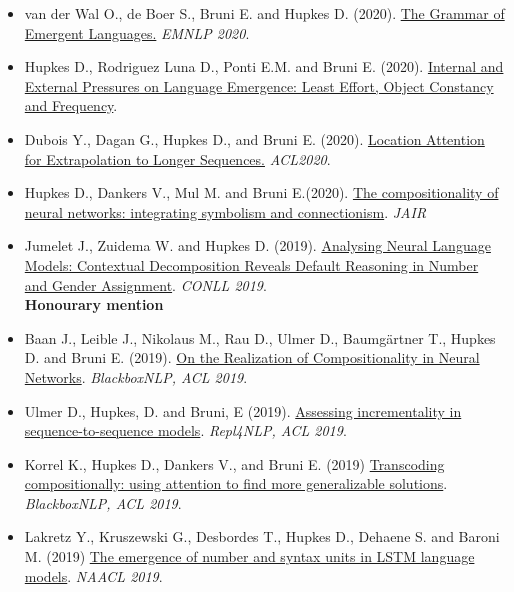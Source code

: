\begin{itemize}
\setlength\itemsep{5pt}
\item van der Wal O., de Boer S., Bruni E. and Hupkes D. (2020). \href{https://www.aclweb.org/anthology/2020.emnlp-main.270.pdf}{The Grammar of Emergent Languages.} \textit{EMNLP 2020}.

    \item Hupkes D., Rodriguez Luna D., Ponti E.M. and Bruni E. (2020). \href{https://arxiv.org/pdf/2004.03868.pdf}{Internal and External Pressures on Language Emergence: Least Effort, Object Constancy and Frequency}.

    \item Dubois Y., Dagan G., Hupkes D., and Bruni E. (2020). \href{https://www.aclweb.org/anthology/2020.acl-main.39.pdf}{Location Attention for Extrapolation to Longer Sequences.} \textit{ACL2020}.
        
    \item Hupkes D., Dankers V., Mul M. and Bruni E.(2020). \href{https://www.jair.org/index.php/jair/article/view/11674/26576}{The compositionality of neural networks: integrating symbolism and connectionism}. \textit{JAIR}
    
    \item Jumelet J., Zuidema W. and Hupkes D. (2019). \href{https://arxiv.org/pdf/1909.08975.pdf}{Analysing Neural Language Models: Contextual Decomposition Reveals Default Reasoning in Number and Gender Assignment}. \textit{CONLL 2019}.\\ \textbf{Honourary mention}
    
    \item Baan J., Leible J., Nikolaus M., Rau D., Ulmer D., Baumgärtner T., Hupkes D. and Bruni E. (2019). \href{https://www.aclweb.org/anthology/W19-4814}{On the Realization of Compositionality in Neural Networks}. \textit{BlackboxNLP, ACL 2019}. 
    
    \item Ulmer D., Hupkes, D. and Bruni, E (2019). \href{https://www.aclweb.org/anthology/W19-4324}{Assessing incrementality in sequence-to-sequence models}. \textit{Repl4NLP, ACL 2019}. 
    
    \item Korrel K., Hupkes D., Dankers V., and Bruni E. (2019) \href{https://www.aclweb.org/anthology/W19-4801}{Transcoding compositionally: using attention to find more generalizable solutions}. \textit{BlackboxNLP, ACL 2019}.
    
    \item Lakretz Y., Kruszewski G., Desbordes T., Hupkes D., Dehaene S. and Baroni M. (2019) \href{https://www.aclweb.org/anthology/N19-1002}{The emergence of number and syntax units in LSTM language models}. \textit{NAACL 2019}.


\end{itemize}
